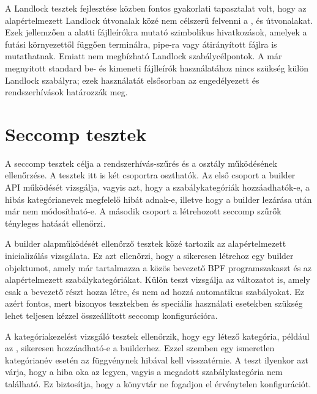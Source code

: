 A Landlock tesztek fejlesztése közben fontos gyakorlati tapasztalat volt, hogy
az alapértelmezett Landlock útvonalak közé nem célszerű felvenni a
,  és
 útvonalakat. Ezek jellemzően a
 alatti fájlleírókra mutató
szimbolikus hivatkozások, amelyek a futási környezettől függően terminálra,
pipe-ra vagy átirányított fájlra is mutathatnak. Emiatt nem megbízható
Landlock szabálycélpontok. A már megnyitott standard be- és kimeneti
fájlleírók használatához nincs szükség külön Landlock szabályra; ezek
használatát elsősorban az engedélyezett  és 
rendszerhívások határozzák meg.

\section{Seccomp tesztek}

A seccomp tesztek célja a rendszerhívás-szűrés és a
 osztály működésének ellenőrzése. A tesztek itt is két
csoportra oszthatók. Az első csoport a builder API működését vizsgálja, vagyis
azt, hogy a szabálykategóriák hozzáadhatók-e, a hibás kategórianevek megfelelő
hibát adnak-e, illetve hogy a builder lezárása után már nem módosítható-e. A
második csoport a létrehozott seccomp szűrők tényleges hatását ellenőrzi.

A builder alapműködését ellenőrző tesztek közé tartozik az alapértelmezett
inicializálás vizsgálata. Ez azt ellenőrzi, hogy a
 sikeresen létrehoz egy builder
objektumot, amely már tartalmazza a közös bevezető BPF programszakaszt és az
alapértelmezett szabálykategóriákat. Külön teszt vizsgálja az
 változatot is, amely csak a
bevezető részt hozza létre, és nem ad hozzá automatikus szabályokat. Ez azért
fontos, mert bizonyos tesztekben és speciális használati esetekben szükség lehet
teljesen kézzel összeállított seccomp konfigurációra.

A kategóriakezelést vizsgáló tesztek ellenőrzik, hogy egy létező kategória,
például az , sikeresen hozzáadható-e a builderhez. Ezzel szemben egy
ismeretlen kategórianév esetén az  függvénynek hibával kell
visszatérnie. A teszt ilyenkor azt várja, hogy a hiba oka az
 legyen, vagyis a megadott szabálykategória nem található. Ez
biztosítja, hogy a könyvtár ne fogadjon el érvénytelen konfigurációt.

